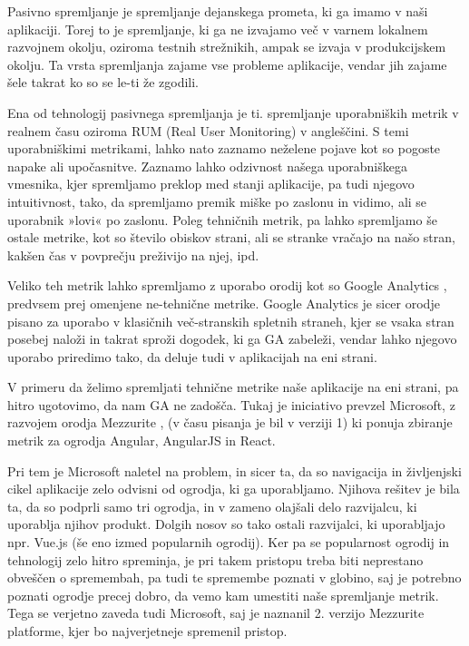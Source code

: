 \documentclass[a4paper, 12pt]{book}
\begin{document}
Pasivno spremljanje je spremljanje dejanskega prometa, ki ga imamo v naši aplikaciji. Torej to je spremljanje, ki ga ne izvajamo več v varnem lokalnem razvojnem okolju, oziroma testnih strežnikih, ampak se izvaja v produkcijskem okolju. Ta vrsta spremljanja zajame vse probleme aplikacije, vendar jih zajame šele takrat ko so se le-ti že zgodili.

Ena od tehnologij pasivnega spremljanja je ti. spremljanje uporabniških metrik v realnem času oziroma RUM (Real User Monitoring) v angleščini. S temi uporabniškimi metrikami, lahko nato zaznamo neželene pojave kot so pogoste napake ali upočasnitve. Zaznamo lahko odzivnost našega uporabniškega vmesnika, kjer spremljamo preklop med stanji aplikacije, pa tudi njegovo intuitivnost, tako, da spremljamo premik miške po zaslonu in vidimo, ali se uporabnik »lovi« po zaslonu. Poleg tehničnih metrik, pa lahko spremljamo še ostale metrike, kot so število obiskov strani, ali se stranke vračajo na našo stran, kakšen čas v povprečju preživijo na njej, ipd.

Veliko teh metrik lahko spremljamo z uporabo orodij kot so Google Analytics \cite{ga_website}, predvsem prej omenjene ne-tehnične metrike. Google Analytics je sicer orodje pisano za uporabo v klasičnih več-stranskih spletnih straneh, kjer se vsaka stran posebej naloži in takrat sproži dogodek, ki ga GA zabeleži, vendar lahko njegovo uporabo priredimo tako, da deluje tudi v aplikacijah na eni strani.

V primeru da želimo spremljati tehnične metrike naše aplikacije na eni strani, pa hitro ugotovimo, da nam GA ne zadošča. Tukaj je iniciativo prevzel Microsoft, z razvojem orodja Mezzurite \cite{mezzurite_website}, (v času pisanja je bil v verziji 1) ki ponuja zbiranje metrik za ogrodja Angular, AngularJS in React.

Pri tem je Microsoft naletel na problem, in sicer ta, da so navigacija in življenjski cikel aplikacije zelo odvisni od ogrodja, ki ga uporabljamo. Njihova rešitev je bila ta, da so podprli samo tri ogrodja, in v zameno olajšali delo razvijalcu, ki uporablja njihov produkt. Dolgih nosov so tako ostali razvijalci, ki uporabljajo npr. Vue.js (še eno izmed popularnih ogrodij). Ker pa se popularnost ogrodij in tehnologij zelo hitro spreminja, je pri takem pristopu treba biti neprestano obveščen o spremembah, pa tudi te spremembe poznati v globino, saj je potrebno poznati ogrodje precej dobro, da vemo kam umestiti naše spremljanje metrik. Tega se verjetno zaveda tudi Microsoft, saj je naznanil 2. verzijo Mezzurite platforme, kjer bo najverjetneje spremenil pristop.
\end{document}
